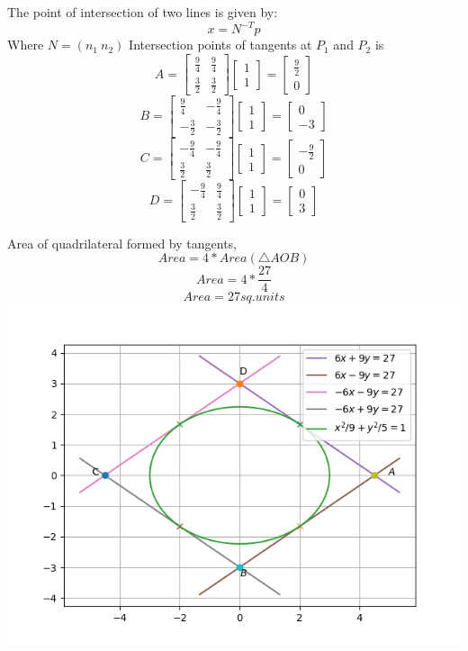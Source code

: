 \documentclass{beamer}
\begin{document}
\begin{frame}
The point of intersection of two lines is given by:
\[x = N^{-T} p\]
Where $N = (n_1 \ n_2)$
Intersection points of tangents at $P_1$ and $P_2$ is
\[
A
=
\begin{bmatrix}
\frac{9}{4} & \frac{9}{4}\\
\frac{3}{2} & \frac{3}{2}
\end{bmatrix}
\begin{bmatrix}
1\\
1
\end{bmatrix}
=
\begin{bmatrix}
\frac{9}{2} \\
0
\end{bmatrix}
\]
\[
B
=
\begin{bmatrix}
\frac{9}{4} & -\frac{9}{4}\\
-\frac{3}{2} & -\frac{3}{2}
\end{bmatrix}
\begin{bmatrix}
1\\
1
\end{bmatrix}
=
\begin{bmatrix}
0 \\
-3
\end{bmatrix}
\]
\[
C
=
\begin{bmatrix}
-\frac{9}{4} & -\frac{9}{4}\\
\frac{3}{2} & \frac{3}{2}
\end{bmatrix}
\begin{bmatrix}
1\\
1
\end{bmatrix}
=
\begin{bmatrix}
-\frac{9}{2} \\
0
\end{bmatrix}
\]
\[
D
=
\begin{bmatrix}
-\frac{9}{4} & \frac{9}{4}\\
\frac{3}{2} & \frac{3}{2}
\end{bmatrix}
\begin{bmatrix}
1\\
1
\end{bmatrix}
=
\begin{bmatrix}
0 \\
3
\end{bmatrix}
\]

\end{frame}

\begin{frame}
Area of quadrilateral formed by tangents,
\[Area = 
4 * Area(\triangle AOB)
\]
\[
Area =
4 * \frac{27}{4}\]
\[Area = 
27
sq. units\]
\includegraphics[scale=0.5]{graph}
\end{frame}
\end{document}
